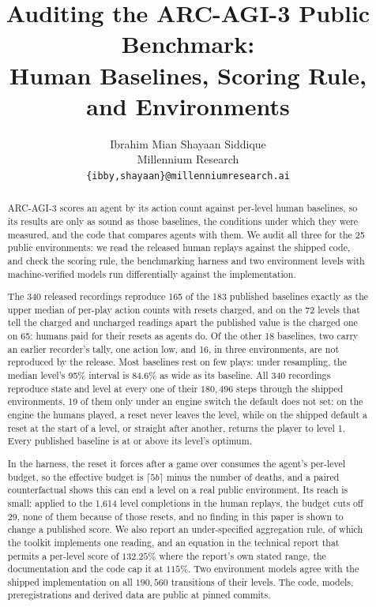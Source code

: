 \documentclass[11pt]{article}
\title{Auditing the ARC-AGI-3 Public Benchmark:\\
Human Baselines, Scoring Rule, and Environments}
\author{Ibrahim Mian \qquad Shayaan Siddique\\[2pt]
\normalsize Millennium Research\\[2pt]
\normalsize \texttt{\{ibby,shayaan\}@millenniumresearch.ai}}
\date{}
\begin{document}
\maketitle

\begin{abstract}
ARC-AGI-3 scores an agent by its action count against per-level human
baselines, so its results are only as sound as those baselines, the conditions
under which they were measured, and the code that compares agents with them.
We audit all three for the 25 public environments: we read the released human
replays against the shipped code, and check the scoring rule, the benchmarking
harness and two environment levels with machine-verified models run
differentially against the implementation.

The 340 released recordings reproduce 165 of the 183 published baselines
exactly as the upper median of per-play action counts with resets charged, and
on the 72 levels that tell the charged and uncharged readings apart the
published value is the charged one on 65: humans paid for their resets as
agents do. Of the other 18 baselines, two carry an earlier recorder's tally, one
action low, and 16, in three environments, are not reproduced by the release.
Most baselines rest on few plays: under resampling, the median level's 95\%
interval is 84.6\% as wide as its baseline. All 340 recordings reproduce state and level at every one of their
$180{,}496$ steps through the shipped environments, 19 of them only under an
engine switch the default does not set: on the engine the humans played, a
reset never leaves the level, while on the shipped default a reset at the start
of a level, or straight after another, returns the player to level 1. Every
published baseline is at or above its level's optimum.

In the harness, the reset it forces after a game over consumes the agent's
per-level budget, so the effective budget is $\lceil 5b \rceil$ minus the number
of deaths, and a paired counterfactual shows this can end a level on a real
public environment. Its reach is small: applied to the 1,614 level completions
in the human replays, the budget cuts off 29, none of them because of those
resets, and no finding in this paper is shown to change a published score. We also report an under-specified aggregation rule, of which the
toolkit implements one reading, and an equation in the technical report that
permits a per-level score of $132.25\%$ where the report's own stated range,
the documentation and the code cap it at $115\%$. Two environment models agree with the shipped implementation on all
$190{,}560$ transitions of their levels. The code, models, preregistrations and
derived data are public at pinned commits.
\end{abstract}
\end{document}
